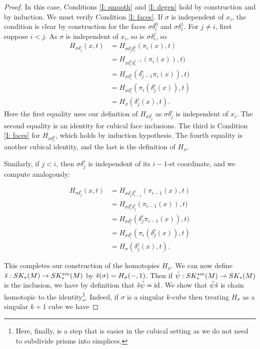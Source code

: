 \begin{proof}
In this case, Conditions \eqref{I: smooth} and \eqref{I: degen} hold by construction and by induction. We must verify Condition \eqref{I: faces}. If $\sigma$ is independent of $x_i$, the condition is clear by construction for the faces $\sigma\delta_i^0$ and $\sigma\delta_i^1$. For $j\neq i$, first suppose $i<j$. As $\sigma$ is independent of $x_i$, so is $\sigma\delta^j_\epsilon$, so
\begin{align*}
H_{\sigma\delta_j^\epsilon}(x,t)&=H_{\sigma\delta_j^\epsilon \delta_i^0}(\pi_i(x),t)\\
&=H_{\sigma \delta_i^0\delta^{j-1}_\epsilon}(\pi_i(x)),t)\\
&=H_{\sigma \delta_i^0}(\delta_{j-1}^\epsilon\pi_i(x)),t)\\
&=H_{\sigma \delta_i^0}(\pi_i(\delta_j^\epsilon(x)),t)\\
&=H_\sigma(\delta_j^\epsilon(x),t).
\end{align*}
Here the first equality uses our definition of $H_{\sigma\delta_j^\epsilon}$ as $\sigma\delta_j^\epsilon$ is independent of $x_i$. The second equality is an identity for cubical face inclusions. The third is Condition \eqref{I: faces} for  $H_{\sigma \delta_i^0}$, which holds by induction hypothesis. The fourth equality is another cubical identity, and the last is the definition of $H_\sigma$.

Similarly, if $j<i$, then $\sigma\delta_j^\epsilon$ is independent of its $i-1$-st coordinate, and we compute analogously:

\begin{align*}
H_{\sigma\delta_j^\epsilon}(x,t)&=H_{\sigma\delta_j^\epsilon \delta_{i-1}^0}(\pi_{i-1}(x),t)\\
&=H_{\sigma \delta_{i}^0\delta_{j}^\epsilon}(\pi_{i-1}(x)),t)\\
&=H_{\sigma \delta_{i}^0}(\delta_{j}^\epsilon\pi_{i-1}(x)),t)\\
&=H_{\sigma \delta_{i}^0}(\pi_{i}(\delta_j^\epsilon(x)),t)\\
&=H_\sigma(\delta_j^\epsilon(x),t).
\end{align*}

This completes our construction of the homotopies $H_\sigma$. We can now define $\tilde s:SK_*(M)\to SK^{sm}_*(M)$ by $\tilde s(\sigma)=H_\sigma(-,1)$. Then if $\tilde \psi: SK_*^{sm}(M)\to SK_*(M)$ is the inclusion, we have by definition that $\tilde s \tilde \psi=\mathrm{id}$. We show that $\tilde\psi\tilde s$ is chain homotopic to the identity\footnote{Here, finally, is a step that is easier in the cubical setting as we do not need to subdivide prisms into simplices.}. Indeed, if $\sigma$ is a singular $k$-cube then treating $H_\sigma$ as a singular $k+1$ cube we have


\end{proof}
